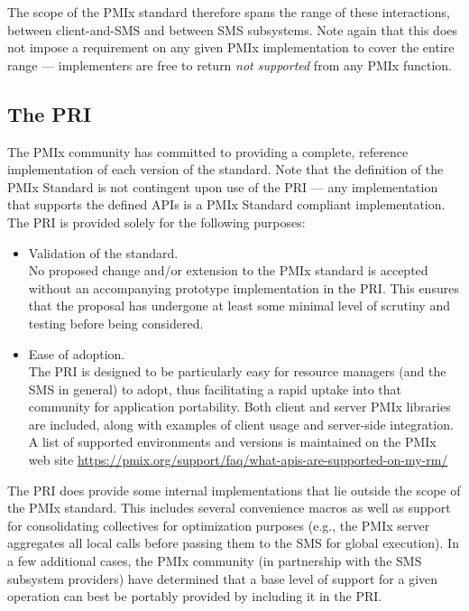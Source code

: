 The scope of the PMIx standard therefore spans the range of these interactions, between client-and-SMS and between SMS
subsystems. Note again that this does not impose a requirement on any given PMIx implementation to cover the entire
range --- implementers are free to return \textit{not supported} from any PMIx function.


\subsection{The \acf{PRI}}

The \ac{PMIx} community has committed to providing a complete, reference implementation of each version of the standard. Note that the definition of the \ac{PMIx} Standard is not contingent upon use of the \acf{PRI} --- any implementation that supports the defined \acp{API} is a \ac{PMIx} Standard compliant implementation.
The \ac{PRI} is provided solely for the following purposes:
\begin{itemize}
\item Validation of the standard.\\
No proposed change and/or extension to the \ac{PMIx} standard is accepted without an accompanying prototype implementation in the \ac{PRI}.
This ensures that the proposal has undergone at least some minimal level of scrutiny and testing before being considered.
\item Ease of adoption.\\
The \ac{PRI} is designed to be particularly easy for resource managers (and the \ac{SMS} in general) to adopt, thus facilitating a rapid uptake into that community for application portability.
Both client and server \ac{PMIx} libraries are included, along with examples of client usage and server-side integration.
A list of supported environments and versions is maintained on the \ac{PMIx} web site \url{https://pmix.org/support/faq/what-apis-are-supported-on-my-rm/}
\end{itemize}

The \ac{PRI} does provide some internal implementations that lie outside the scope of the \ac{PMIx} standard. This includes several convenience macros as well as support for consolidating collectives for optimization purposes (e.g., the \ac{PMIx} server aggregates all local  calls before
passing them to the \ac{SMS} for global execution). In a few additional cases, the \ac{PMIx} community (in partnership with the \ac{SMS} subsystem providers) have determined that a base level of support for a given operation can best be portably provided by including it in the \ac{PRI}.

